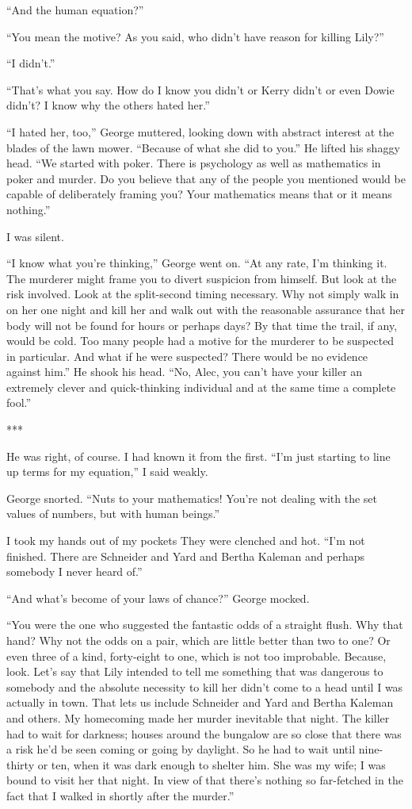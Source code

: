 {“And the human equation?”

“You mean the motive? As you said, who didn’t have reason for killing Lily?”

“I didn’t.”

“That’s what you say. How do I know you didn’t or Kerry didn’t or even Dowie didn’t? I know why the others hated her.”

“I hated her, too,” George muttered, looking down with abstract interest at the blades of the lawn mower. “Because of what she did to you.” He lifted his shaggy head. “We started with poker. There is psychology as well as mathematics in poker and murder. Do you believe that any of the people you mentioned would be capable of deliberately framing you? Your mathematics means that or it means nothing.”

I was silent.

“I know what you’re thinking,” George went on. “At any rate, I’m thinking it. The murderer might frame you to divert suspicion from himself. But look at the risk involved. Look at the split-second timing necessary. Why not simply walk in on her one night and kill her and walk out with the reasonable assurance that her body will not be found for hours or perhaps days? By that time the trail, if any, would be cold. Too many people had a motive for the murderer to be suspected in particular. And what if he were suspected? There would be no evidence against him.” He shook his head. “No, Alec, you can’t have your killer an extremely clever and quick-thinking individual and at the same time a complete fool.”

***

He was right, of course. I had known it from the first. “I’m just starting to line up terms for my equation,” I said weakly.

George snorted. “Nuts to your mathematics! You’re not dealing with the set values of numbers, but with human beings.”

I took my hands out of my pockets They were clenched and hot. “I’m not finished. There are Schneider and Yard and Bertha Kaleman and perhaps somebody I never heard of.”

“And what’s become of your laws of chance?” George mocked.

“You were the one who suggested the fantastic odds of a straight flush. Why that hand? Why not the odds on a pair, which are little better than two to one? Or even three of a kind, forty-eight to one, which is not too improbable. Because, look. Let’s say that Lily intended to tell me something that was dangerous to somebody and the absolute necessity to kill her didn’t come to a head until I was actually in town. That lets us include Schneider and Yard and Bertha Kaleman and others. My homecoming made her murder inevitable that night. The killer had to wait for darkness; houses around the bungalow are so close that there was a risk he’d be seen coming or going by daylight. So he had to wait until nine-thirty or ten, when it was dark enough to shelter him. She was my wife; I was bound to visit her that night. In view of that there’s nothing so far-fetched in the fact that I walked in shortly after the murder.”

}
